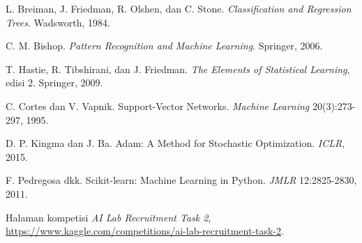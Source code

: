 \documentclass[10pt,a4paper]{article}
\begin{document}
\begin{enumerate}[label={[\arabic*]}]
\item L. Breiman, J. Friedman, R. Olshen, dan C. Stone. \emph{Classification and Regression Trees}. Wadsworth, 1984.
\item C. M. Bishop. \emph{Pattern Recognition and Machine Learning}. Springer, 2006.
\item T. Hastie, R. Tibshirani, dan J. Friedman. \emph{The Elements of Statistical Learning}, edisi 2. Springer, 2009.
\item C. Cortes dan V. Vapnik. Support-Vector Networks. \emph{Machine Learning} 20(3):273-297, 1995.
\item D. P. Kingma dan J. Ba. Adam: A Method for Stochastic Optimization. \emph{ICLR}, 2015.
\item F. Pedregosa dkk. Scikit-learn: Machine Learning in Python. \emph{JMLR} 12:2825-2830, 2011.
\item Halaman kompetisi \emph{AI Lab Recruitment Task 2}, \url{https://www.kaggle.com/competitions/ai-lab-recruitment-task-2}.
\end{enumerate}
\end{document}

